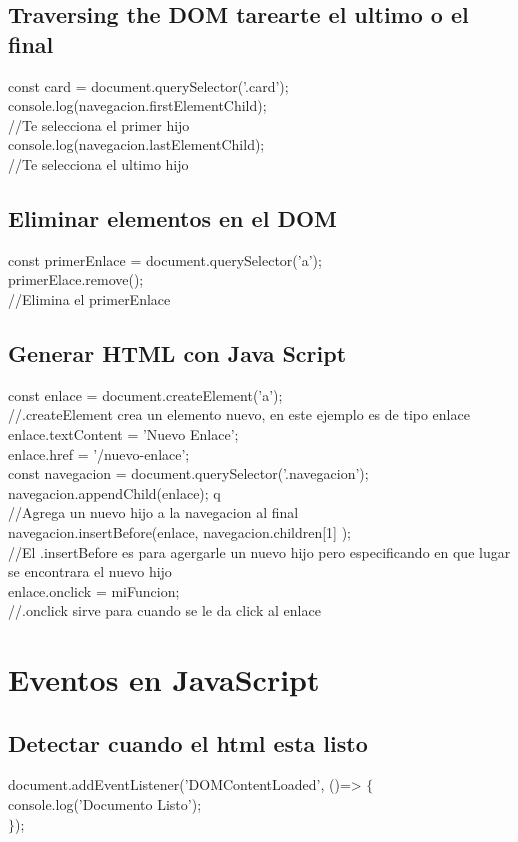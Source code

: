 \documentclass[10pt,a4paper]{article}
\begin{document}
\subsection{Traversing the DOM tarearte el ultimo o el final}
const card = document.querySelector('.card');
console.log(navegacion.firstElementChild);\\
//Te selecciona el primer hijo \\
console.log(navegacion.lastElementChild);\\
//Te selecciona el ultimo hijo \\
\subsection{Eliminar elementos en el DOM}
const primerEnlace = document.querySelector('a'); \\
primerElace.remove(); \\
//Elimina el primerEnlace \\
\newpage 
\subsection{Generar HTML con Java Script}
const enlace = document.createElement('a');\\ 
//.createElement crea un elemento nuevo, en este ejemplo es de tipo enlace \\
enlace.textContent = 'Nuevo Enlace'; \\
enlace.href = '/nuevo-enlace';\\
const navegacion = document.querySelector('.navegacion'); \\
navegacion.appendChild(enlace); q\\
//Agrega un nuevo hijo a la navegacion al final \\
navegacion.insertBefore(enlace, navegacion.children[1] ); \\
//El .insertBefore es para agergarle un nuevo hijo pero especificando en que lugar se encontrara el nuevo hijo\\
enlace.onclick = miFuncion; \\
//.onclick sirve para cuando se le da click al enlace \\

\newpage
\section{Eventos en JavaScript}
\subsection{Detectar cuando el html esta listo}
document.addEventListener('DOMContentLoaded', ()=> $ \{ $ \\ 
console.log('Documento Listo');  \\
$ \} $); \\
\end{document}
